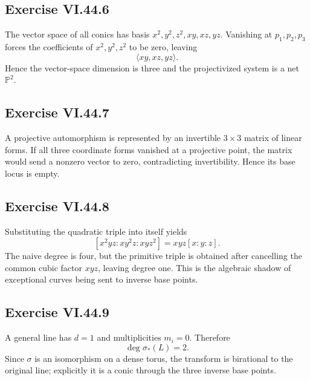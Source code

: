 \subsection*{Exercise VI.44.6}
\begin{solution}
The vector space of all conics has basis \(x^2,y^2,z^2,xy,xz,yz\).  Vanishing at \(p_1,p_2,p_3\) forces the coefficients of \(x^2,y^2,z^2\) to be zero, leaving
\[
\langle xy,xz,yz\rangle.
\]
Hence the vector-space dimension is three and the projectivized system is a net \(\mathbb P^2\).
\end{solution}

\subsection*{Exercise VI.44.7}
\begin{solution}
A projective automorphism is represented by an invertible \(3\times3\) matrix of linear forms.  If all three coordinate forms vanished at a projective point, the matrix would send a nonzero vector to zero, contradicting invertibility.  Hence its base locus is empty.
\end{solution}

\subsection*{Exercise VI.44.8}
\begin{solution}
Substituting the quadratic triple into itself yields
\[
[x^2yz:xy^2z:xyz^2]=xyz[x:y:z].
\]
The naive degree is four, but the primitive triple is obtained after cancelling the common cubic factor \(xyz\), leaving degree one.  This is the algebraic shadow of exceptional curves being sent to inverse base points.
\end{solution}

\subsection*{Exercise VI.44.9}
\begin{solution}
A general line has \(d=1\) and multiplicities \(m_i=0\).  Therefore
\[
\deg\sigma_*(L)=2.
\]
Since \(\sigma\) is an isomorphism on a dense torus, the transform is birational to the original line; explicitly it is a conic through the three inverse base points.
\end{solution}

